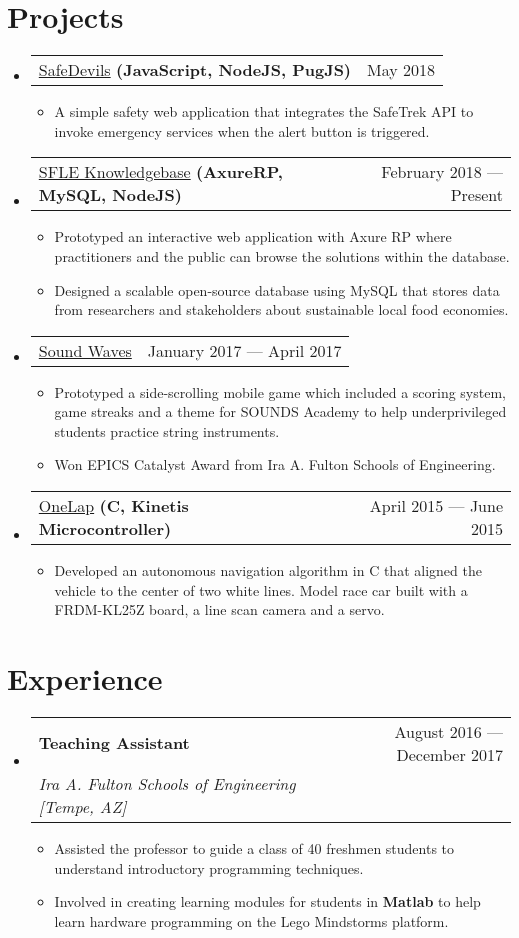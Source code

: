 \documentclass[letterpaper,11pt]{article}
\makeatletter
\newcommand{\sectionStart}{
  \begin{itemize}[label={},leftmargin=0in]
}
\newcommand{\sectionEnd}{
  \end{itemize}
}
\newcommand{\jobHeading}[3]{
  \vspace{-1pt}
  \item
  \begin{tabular*}{1.0\textwidth}{l@{\extracolsep{\fill}}r@{}}
    \normalsize{\textbf{#1}} & #2 \\
    \textit{\small#3} \\
  \end{tabular*}\vspace{-5pt}
}
\newcommand{\projectHeading}[4]{
  \vspace{-1pt}
  \item
  \begin{tabular*}{1.0\textwidth}{l@{\extracolsep{\fill}}r@{}}
    \normalsize{{\href{#1}{#2}} \textbf{#3}} & #4 \\
  \end{tabular*}\vspace{-5pt}
}
\newcommand{\listStart}{\begin{itemize}}
\newcommand{\listEnd}{\end{itemize}\vspace{-5pt}}
\newcommand{\bulletItem}[1]{
  \item
  \small{
    {#1 \vspace{-1.8pt}}
  }
}
\makeatother
\begin{document}
\section{Projects}
\sectionStart
  \projectHeading
    {http://testorangesafe.dickwyn.xyz/}
    {SafeDevils}
    {(JavaScript, NodeJS, PugJS)}
    {May 2018}
  \listStart
    \bulletItem
      {A simple safety web application that integrates the SafeTrek API to invoke emergency services when the alert button is triggered.}
  \listEnd
  \projectHeading
    {}
    {SFLE Knowledgebase}
    {(AxureRP, MySQL, NodeJS)}
    {February 2018 --- Present}
  \listStart
    \bulletItem
      {Prototyped an interactive web application with Axure RP where practitioners and the public can browse the solutions within the database.}
    \bulletItem
      {Designed a scalable open-source database using MySQL that stores data from researchers and stakeholders about sustainable local food economies.}
  \listEnd
  \projectHeading
    {https://goo.gl/EsvFb6}
    {Sound Waves}
    {}
    {January 2017 --- April 2017}
  \listStart
    \bulletItem
      {Prototyped a side-scrolling mobile game which included a scoring system, game streaks and a theme for SOUNDS Academy to help underprivileged students practice string instruments.}
    \bulletItem
      {Won EPICS Catalyst Award from Ira A. Fulton Schools of Engineering.}
  \listEnd
  \projectHeading
    {https://github.com/dickwyn/onelap}
    {OneLap}
    {(C, Kinetis Microcontroller)}
    {April 2015 --- June 2015}
  \listStart
    \bulletItem
      {Developed an autonomous navigation algorithm in C that aligned the vehicle to the center of two white lines. Model race car built with a FRDM-KL25Z board, a line scan camera and a servo.}
  \listEnd
\sectionEnd
  
\section{Experience}
\sectionStart
  \jobHeading
    {Teaching Assistant}
    {August 2016 --- December 2017}
    {Ira A. Fulton Schools of Engineering [Tempe, AZ]}
  \listStart
    \bulletItem
    {Assisted the professor to guide a class of 40 freshmen students to understand introductory programming techniques.}
    \bulletItem
    {Involved in creating learning modules for students in \textbf{Matlab} to help learn hardware programming on the Lego Mindstorms platform.}
  \listEnd
\sectionEnd

\end{document}
